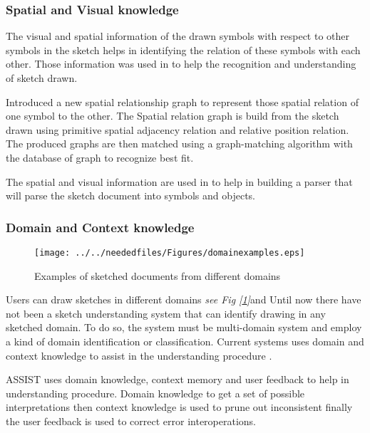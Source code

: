 \subsubsection{	Spatial and Visual knowledge}
\label{sec:SpatialandVisualknowlege}

The visual and spatial information of the drawn symbols with respect to other symbols in the sketch helps in identifying the relation of these symbols with each other.  Those information was used in \cite {Cali63,visualpattern43,incrmentintention41,geometrydomain49,marksacts40,sketchinginterfaces2,captureknowledge19}  to help the recognition and understanding of sketch drawn. 

\cite{SRGraph57}  Introduced a new spatial relationship graph to represent those spatial relation of one symbol to the other. The Spatial relation graph is build from the sketch drawn using primitive spatial adjacency relation and relative position relation.  The produced graphs are then matched using a graph-matching algorithm with the database of graph to recognize best fit. 

The spatial and visual information are used in \cite{XPGParser59} to help in building a parser that will parse the sketch document into symbols and objects. 

\subsubsection{Domain and Context knowledge}
\label{sec:DomainandContextknowledge}

\begin{figure}
	\centering
		\texttt{[image: ../../neededfiles/Figures/domainexamples.eps]}
	\caption[domain examples]{Examples of sketched documents from different domains}
	\label{fig:domainexamples}
\end{figure}

Users can draw sketches in different domains \textit{see Fig [\ref{fig:domainexamples}]}and Until now there have not been a sketch understanding system that can identify drawing in any sketched domain. To do so, the system must be multi-domain system and employ a kind of domain identification or classification.  Current systems uses domain and context knowledge to assist in the understanding procedure\cite {geometrydomain49,RetargetableInteractive58,sketchunderstanding1, HierarchicalParsing7,Mathpad46} . 


ASSIST \cite{AlvaradoFreedom42} uses domain knowledge, context memory and user feedback to help in understanding procedure. Domain knowledge to get a set of possible interpretations then context knowledge is used to prune out inconsistent finally the user feedback is used to correct error interoperations.

